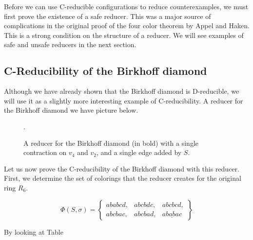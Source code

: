 Before we can use C-reducible configurations to reduce counterexamples, we must first prove the existence of a safe reducer. This was a major source of complications in the original proof of the four color theorem by Appel and Haken. This is a strong condition on the structure of a reducer. We will see examples of safe and unsafe reducers in the next section.

\subsection{C-Reducibility of the Birkhoff diamond}
\label{sec:diamond}

Although we have already shown that the Birkhoff diamond is D-reducible, we will use it as a slightly more interesting example of C-reducibility. A reducer for the Birkhoff diamond we have picture below.

\begin{figure}[!h]
    \centering
    \caption{A reducer for the Birkhoff diamond (in bold) with a single contraction on $v_4$ and $v_2$, and a single edge added by $S$. }.
    \label{fig:diamondreducer}
\end{figure}

Let us now prove the C-reducibility of the Birkhoff diamond with this reducer. First, we determine the set of colorings that the reducer creates for the original ring $R_6$.

\begin{equation}
    \Phi(S, \sigma) = \left\{ \begin{matrix}
        ababcd, & abcbdc, & abcbcd, \\ abcbac, & abcbad, & \underline{ababac}
    \end{matrix}\right\}
\end{equation}

By looking at Table \